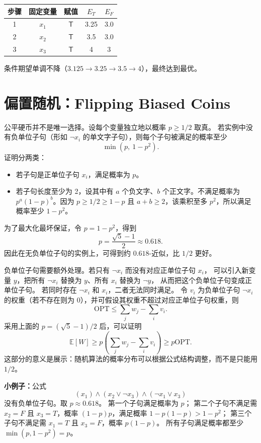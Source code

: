 \documentclass[UTF8,openany,12pt]{ctexbook}
\theoremstyle{remark}
\newcommand{\OPT}{\mathrm{OPT}}
\begin{document}
\begin{center}
\begin{tabular}{ccccc}
  \toprule
  步骤 & 固定变量 & 赋值 & $E_T$ & $E_F$ \\
  \midrule
  1 & $x_1$ & $\mathsf{T}$ & 3.25 & 3.0 \\
  2 & $x_2$ & $\mathsf{T}$ & 3.5 & 3.0 \\
  3 & $x_3$ & $\mathsf{T}$ & 4 & 3 \\
  \bottomrule
\end{tabular}
\end{center}

条件期望单调不降（$3.125 \to 3.25 \to 3.5 \to 4$），最终达到最优。

\section{偏置随机：Flipping Biased Coins}

公平硬币并不是唯一选择。设每个变量独立地以概率 $p\ge 1/2$ 取真。
若实例中没有负单位子句（形如 $\neg x_i$ 的单文字子句），则每个子句被满足的概率至少
\[
  \min(p,\ 1-p^2).
\]
证明分两类：
\begin{itemize}
  \item 若子句是正单位子句 $x_i$，满足概率为 $p$。
  \item 若子句长度至少为 2，设其中有 $a$ 个负文字、$b$ 个正文字。不满足概率为
  $p^a(1-p)^b$。因为 $p\ge1/2\ge1-p$ 且 $a+b\ge2$，该乘积至多 $p^2$，所以满足概率至少 $1-p^2$。
\end{itemize}

为了最大化最坏保证，令 $p=1-p^2$，得到
\[
  p=\frac{\sqrt5-1}{2}\approx0.618.
\]
因此在无负单位子句的实例上，可得到约 $0.618$-近似，比 $1/2$ 更好。

负单位子句需要额外处理。若只有 $\neg x_i$ 而没有对应正单位子句 $x_i$，
可以引入新变量 $y$，把所有 $\neg x_i$ 替换为 $y$、所有 $x_i$ 替换为 $\neg y$，
从而把这个负单位子句变成正单位子句。
若同时存在 $\neg x_i$ 和 $x_i$，二者无法同时满足。
令 $v_i$ 为负单位子句 $\neg x_i$ 的权重（若不存在则为 $0$），并可假设其权重不超过对应正单位子句权重，则
\[
  \OPT\le \sum_j w_j-\sum_i v_i.
\]
采用上面的 $p=(\sqrt5-1)/2$ 后，可以证明
\[
  \mathbb E[W]\ge p\left(\sum_j w_j-\sum_i v_i\right)\ge p\OPT.
\]
这部分的意义是展示：随机算法的概率分布可以根据公式结构调整，而不是只能用 $1/2$。

\textbf{小例子：}公式
\[
  (x_1)\wedge(x_2\vee \neg x_3)\wedge(\neg x_1\vee x_3)
\]
没有负单位子句。取 $p\approx0.618$。
第一个子句满足概率为 $p$；
第二个子句不满足需 $x_2=F$ 且 $x_3=T$，概率 $(1-p)p$，满足概率 $1-p(1-p)>1-p^2$；
第三个子句不满足需 $x_1=T$ 且 $x_3=F$，概率 $p(1-p)$。
所有子句满足概率都至少 $\min(p,1-p^2)=p$。
\end{document}
